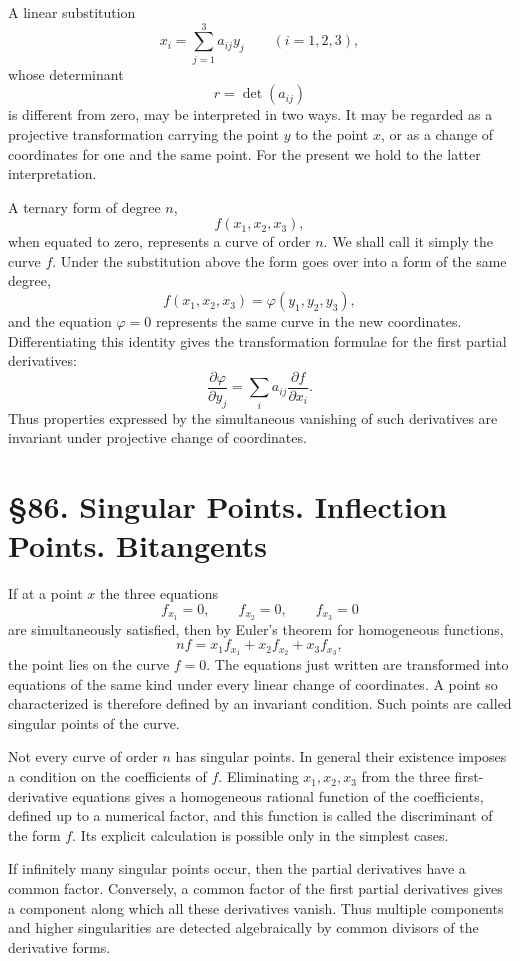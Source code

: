 \documentclass[11pt,a4paper]{book}
\newcommand{\webersection}[2]{\clearpage\section*{\S #1. #2}}
\begin{document}
A linear substitution
\[
x_i=\sum_{j=1}^3 a_{ij}y_j\qquad (i=1,2,3),
\]
whose determinant
\[
r=\det(a_{ij})
\]
is different from zero, may be interpreted in two ways.  It may be regarded as a projective transformation carrying the point \(y\) to the point \(x\), or as a change of coordinates for one and the same point.  For the present we hold to the latter interpretation.

A ternary form of degree \(n\),
\[
f(x_1,x_2,x_3),
\]
when equated to zero, represents a curve of order \(n\).  We shall call it simply the curve \(f\).  Under the substitution above the form goes over into a form of the same degree,
\[
f(x_1,x_2,x_3)=\varphi(y_1,y_2,y_3),
\]
and the equation \(\varphi=0\) represents the same curve in the new coordinates.  Differentiating this identity gives the transformation formulae for the first partial derivatives:
\[
\frac{\partial\varphi}{\partial y_j}
  =\sum_i a_{ij}\frac{\partial f}{\partial x_i}.
\]
Thus properties expressed by the simultaneous vanishing of such derivatives are invariant under projective change of coordinates.

\webersection{86}{Singular Points. Inflection Points. Bitangents}

If at a point \(x\) the three equations
\[
f_{x_1}=0,\qquad f_{x_2}=0,\qquad f_{x_3}=0
\]
are simultaneously satisfied, then by Euler's theorem for homogeneous functions,
\[
nf=x_1f_{x_1}+x_2f_{x_2}+x_3f_{x_3},
\]
the point lies on the curve \(f=0\).  The equations just written are transformed into equations of the same kind under every linear change of coordinates.  A point so characterized is therefore defined by an invariant condition.  Such points are called singular points of the curve.

Not every curve of order \(n\) has singular points.  In general their existence imposes a condition on the coefficients of \(f\).  Eliminating \(x_1,x_2,x_3\) from the three first-derivative equations gives a homogeneous rational function of the coefficients, defined up to a numerical factor, and this function is called the discriminant of the form \(f\).  Its explicit calculation is possible only in the simplest cases.

If infinitely many singular points occur, then the partial derivatives have a common factor.  Conversely, a common factor of the first partial derivatives gives a component along which all these derivatives vanish.  Thus multiple components and higher singularities are detected algebraically by common divisors of the derivative forms.
\end{document}
